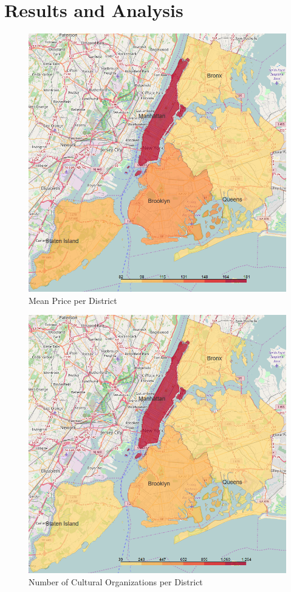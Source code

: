 \documentclass[sigconf]{acmart}
\begin{document}
\section{Results and Analysis}
\label{sec:results}

\begin{figure}[!htpb]
	\centering
	\includegraphics[width=\linewidth]{images/price_per_district}
	\caption{Mean Price per District}
	\label{fig:casPf}
\end{figure}

\begin{figure}[!htpb]
	\centering
	\includegraphics[width=\linewidth]{images/cultural_organizations_per_district}
	\caption{Number of Cultural Organizations per District}
	\label{fig:eshopPf}
\end{figure}
\end{document}

